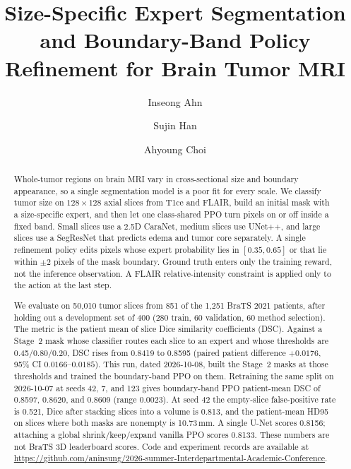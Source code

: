 \documentclass[runningheads]{llncs}
\begin{document}
\title{Size-Specific Expert Segmentation and Boundary-Band Policy Refinement for Brain Tumor MRI}

\author{Inseong Ahn \and Sujin Han \and Ahyoung Choi}

\maketitle

\begin{abstract}
Whole-tumor regions on brain MRI vary in cross-sectional size and boundary appearance, so a single segmentation model is a poor fit for every scale. We classify tumor size on $128\times128$ axial slices from T1ce and FLAIR, build an initial mask with a size-specific expert, and then let one class-shared PPO turn pixels on or off inside a fixed band. Small slices use a 2.5D CaraNet, medium slices use UNet++, and large slices use a SegResNet that predicts edema and tumor core separately. A single refinement policy edits pixels whose expert probability lies in $[0.35,0.65]$ or that lie within $\pm2$ pixels of the mask boundary. Ground truth enters only the training reward, not the inference observation. A FLAIR relative-intensity constraint is applied only to the action at the last step.

We evaluate on 50{,}010 tumor slices from 851 of the 1{,}251 BraTS 2021 patients, after holding out a development set of 400 (280 train, 60 validation, 60 method selection). The metric is the patient mean of slice Dice similarity coefficients (DSC). Against a Stage~2 mask whose classifier routes each slice to an expert and whose thresholds are 0.45/0.80/0.20, DSC rises from 0.8419 to 0.8595 (paired patient difference $+0.0176$, 95\% CI $0.0166$--$0.0185$). This run, dated 2026-10-08, built the Stage~2 masks at those thresholds and trained the boundary-band PPO on them. Retraining the same split on 2026-10-07 at seeds 42, 7, and 123 gives boundary-band PPO patient-mean DSC of 0.8597, 0.8620, and 0.8609 (range 0.0023). At seed 42 the empty-slice false-positive rate is 0.521, Dice after stacking slices into a volume is 0.813, and the patient-mean HD95 on slices where both masks are nonempty is 10.73\,mm. A single U-Net scores 0.8156; attaching a global shrink/keep/expand vanilla PPO scores 0.8133. These numbers are not BraTS 3D leaderboard scores. Code and experiment records are available at \url{https://github.com/aninsung/2026-summer-Interdepartmental-Academic-Conference}.

\end{abstract}
\end{document}
